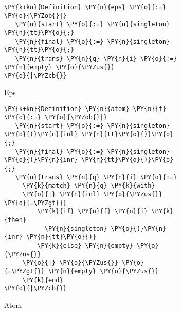\begin{figure}
\begin{minipage}{0.4\textwidth}
\begin{subfigure}{1.0\textwidth}
  \centering
\begin{Verbatim}[commandchars=\\\{\}]
\PY{k+kn}{Definition} \PY{n}{eps} \PY{o}{:=} \PY{o}{\PYZob{}|}
   \PY{n}{start} \PY{o}{:=} \PY{n}{singleton} \PY{n}{tt}\PY{o}{;}
   \PY{n}{final} \PY{o}{:=} \PY{n}{singleton} \PY{n}{tt}\PY{o}{;}
   \PY{n}{trans} \PY{n}{q} \PY{n}{i} \PY{o}{:=} \PY{n}{empty} \PY{o}{\PYZus{}}
\PY{o}{|\PYZcb{}}
\end{Verbatim}
\caption{Eps}
\vspace{3em}
\end{subfigure}
%
\begin{subfigure}[c]{1.0\textwidth}
  \centering
\begin{Verbatim}[commandchars=\\\{\}]
\PY{k+kn}{Definition} \PY{n}{atom} \PY{n}{f} \PY{o}{:=} \PY{o}{\PYZob{}|}
   \PY{n}{start} \PY{o}{:=} \PY{n}{singleton} \PY{o}{(}\PY{n}{inl} \PY{n}{tt}\PY{o}{)}\PY{o}{;}
   \PY{n}{final} \PY{o}{:=} \PY{n}{singleton} \PY{o}{(}\PY{n}{inr} \PY{n}{tt}\PY{o}{)}\PY{o}{;}
   \PY{n}{trans} \PY{n}{q} \PY{n}{i} \PY{o}{:=}
     \PY{k}{match} \PY{n}{q} \PY{k}{with}
     \PY{o}{|} \PY{n}{inl} \PY{o}{\PYZus{}} \PY{o}{=\PYZgt{}}
         \PY{k}{if} \PY{n}{f} \PY{n}{i} \PY{k}{then}
           \PY{n}{singleton} \PY{o}{(}\PY{n}{inr} \PY{n}{tt}\PY{o}{)}
         \PY{k}{else} \PY{n}{empty} \PY{o}{\PYZus{}}
     \PY{o}{|} \PY{o}{\PYZus{}} \PY{o}{=\PYZgt{}} \PY{n}{empty} \PY{o}{\PYZus{}}
     \PY{k}{end}
\PY{o}{|\PYZcb{}}
\end{Verbatim}
\caption{Atom}
\vspace{3em}
\end{subfigure}
%
\begin{subfigure}{1.0\textwidth}

\end{subfigure}
\end{minipage}
\end{figure}
